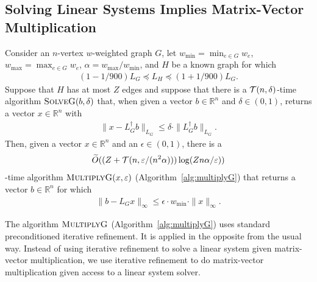 \subsection{Solving Linear Systems Implies Matrix-Vector Multiplication}
\begin{lemma}\label{lem:mul-given-solve}
Consider an $n$-vertex $w$-weighted graph $G$, let $w_{\min} = \min_{e\in G} w_e $, $w_{\max} = \max_{e\in G} w_e$, $\alpha = w_{\max} / w_{\min}$, and $H$ be a known graph for which \begin{align*}
    (1 - 1/900)L_G
    \preceq 
    L_H
    \preceq 
    (1 + 1/900)L_G.
\end{align*} Suppose that $H$ has at most $Z$ edges and suppose that there is a $\T(n,\delta)$-time algorithm $\textsc{SolveG}(b,\delta)$ that, when given a vector $b\in \mathbb{R}^n$ and $\delta\in (0,1)$, returns a vector $x\in \mathbb{R}^n$ with
\begin{align*}
\|x - L_G^{\dag} b\|_{L_G}\le \delta \cdot \|L_G^{\dag}b\|_{L_G}.
\end{align*}
Then, given a vector $x \in \mathbb{R}^n$ and an $\epsilon \in (0,1)$, there is a 
\begin{align*}
\tilde{O}((Z + \T(n,\epsilon/(n^2\alpha)))\log(Zn\alpha/\epsilon))
\end{align*}
-time algorithm $\textsc{MultiplyG}(x,\epsilon)$ (Algorithm~\ref{alg:multiplyG}) that returns a vector $b\in \mathbb{R}^n$ for which
\begin{align*}
\|b - L_G x\|_{\infty}\le \epsilon \cdot w_{\min} \cdot \|x\|_{\infty}.
\end{align*} 
\end{lemma}

The algorithm $\textsc{MultiplyG}$ (Algorithm~\ref{alg:multiplyG}) uses standard preconditioned iterative refinement. It is applied in the opposite from the usual way. Instead of using iterative refinement to solve a linear system given matrix-vector multiplication, we use iterative refinement to do matrix-vector multiplication given access to a linear system solver.


